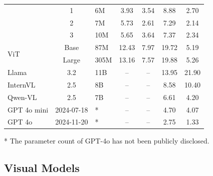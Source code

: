 \begin{table}[ht]
\begin{tabular}{lclcccc}
                                        & 1       &  6M    & 3.93   & 3.54    & 8.88     & 2.70      \\
                                        & 2       &  7M    & 5.73   & 2.61    & 7.29     & 2.14      \\
                                        & 3       &  10M   & 5.65   & 3.64    & 7.37     & 2.34      \\ \midrule
\multirow{2}{*}{\gls{ViT}}              & Base    &  87M   & 12.43  & 7.97    & 19.72    & 5.19      \\
                                        & Large   &  305M  & 13.16  & 7.57    & 19.88    & 5.26      \\ \midrule
Llama                                &  3.2     &     11B   & --     & --      & 13.95    & 21.90     \\
InternVL                             & 2.5      &   8B     & --     & --      & 8.58     & 10.40     \\
Qwen-VL                              & 2.5       &   7B     & --     & --      & 6.61     & 4.20      \\
GPT 4o mini                                 & 2024-07-18    &   *     & --     & --      & 4.70     & 4.07      \\
GPT 4o                                  & 2024-11-20      &    *    & --     & --      & 2.75     & 1.33      \\ \bottomrule

\end{tabular}
\smallskip
\parbox[t]{\textwidth}{\footnotesize
    * The parameter count of GPT-4o has not been publicly disclosed.}
\end{table}

\subsection{Visual Models}
\label{sec:visual_models}

